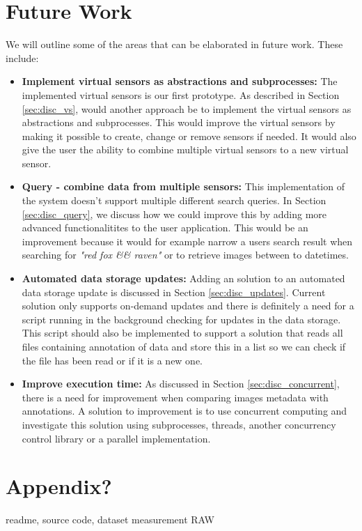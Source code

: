 \documentclass[USenglish]{uit-thesis}
\begin{document}
\chapter{Future Work}
We will outline some of the areas that can be elaborated in future work. These include:

\begin{itemize}
\item \textbf{Implement virtual sensors as abstractions and subprocesses:} The implemented virtual sensors is our first prototype. As described in Section \ref{sec:disc_vs}, would another approach be to implement the virtual sensors as abstractions and subprocesses. This would improve the virtual sensors by making it possible to create, change or remove sensors if needed. It would also give the user the ability to combine multiple virtual sensors to a new virtual sensor.

\item \textbf{Query - combine data from multiple sensors:} This implementation of the system doesn't support multiple different search queries. In Section \ref{sec:disc_query}, we discuss how we could improve this by adding more advanced functionalitites to the user application. This would be an improvement because it would for example narrow a users search result when searching for \textit{"red fox \&\& raven"} or to retrieve images between to datetimes. 

\item \textbf{Automated data storage updates:} Adding an solution to an automated data storage update is discussed in Section \ref{sec:disc_updates}. Current solution only supports on-demand updates and there is definitely a need for a script running in the background checking for updates in the data storage. This script should also be implemented to support a solution that reads all files containing annotation of data and store this in a list so we can check if the file has been read or if it is a new one.


\item \textbf{Improve execution time:} As discussed in Section \ref{sec:disc_concurrent}, there is a need for improvement when comparing images metadata with annotations. A solution to improvement is to use concurrent computing and investigate this solution using subprocesses, threads, another concurrency control library or a parallel implementation.

\end{itemize}


\chapter{Appendix?}
readme, source code, dataset measurement RAW
\backmatter
\end{document}
